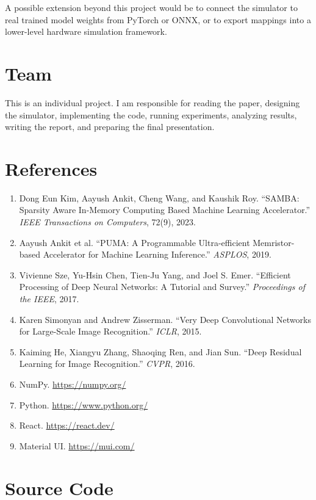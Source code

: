 \documentclass[11pt]{article}
\begin{document}
A possible extension beyond this project would be to connect the simulator to real trained model weights from PyTorch or ONNX, or to export mappings into a lower-level hardware simulation framework.

\section{Team}

This is an individual project. I am responsible for reading the paper, designing the simulator, implementing the code, running experiments, analyzing results, writing the report, and preparing the final presentation.

\section{References}

\begin{enumerate}
    \item Dong Eun Kim, Aayush Ankit, Cheng Wang, and Kaushik Roy. ``SAMBA: Sparsity Aware In-Memory Computing Based Machine Learning Accelerator.'' \textit{IEEE Transactions on Computers}, 72(9), 2023.
    \item Aayush Ankit et al. ``PUMA: A Programmable Ultra-efficient Memristor-based Accelerator for Machine Learning Inference.'' \textit{ASPLOS}, 2019.
    \item Vivienne Sze, Yu-Hsin Chen, Tien-Ju Yang, and Joel S. Emer. ``Efficient Processing of Deep Neural Networks: A Tutorial and Survey.'' \textit{Proceedings of the IEEE}, 2017.
    \item Karen Simonyan and Andrew Zisserman. ``Very Deep Convolutional Networks for Large-Scale Image Recognition.'' \textit{ICLR}, 2015.
    \item Kaiming He, Xiangyu Zhang, Shaoqing Ren, and Jian Sun. ``Deep Residual Learning for Image Recognition.'' \textit{CVPR}, 2016.
    \item NumPy. \url{https://numpy.org/}
    \item Python. \url{https://www.python.org/}
    \item React. \url{https://react.dev/}
    \item Material UI. \url{https://mui.com/}
\end{enumerate}

\section{Source Code}
\end{document}
